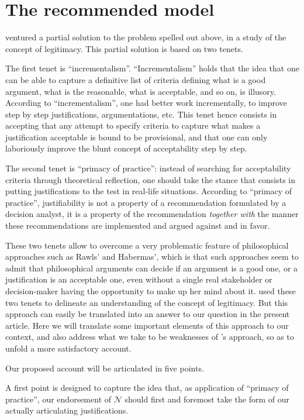 \documentclass[preprint, french, english, 11pt, authoryear]{elsarticle}%
\newcommand{\adv}{\mathscr{N}}
\begin{document}
\section{The recommended model}
\cite{meinard_what_2017} ventured a partial solution to the problem spelled out above, in a study of the concept of legitimacy. This partial solution is based on two tenets.

The first tenet is ``incrementalism''. ``Incrementalism'' holds that the idea that one can be able to capture a definitive list of criteria defining what is a good argument, what is the reasonable, what is acceptable, and so on, is illusory. According to ``incrementalism'', one had better work incrementally, to improve step by step justifications, argumentations, etc. This tenet hence consists in accepting that any attempt to specify criteria to capture what makes a justification acceptable is bound to be provisional, and that one can only laboriously improve the blunt concept of acceptability step by step.

The second tenet is ``primacy of practice'': instead of searching for acceptability criteria through theoretical reflection, one should take the stance that consists in putting justifications to the test in real-life situations. According to ``primacy of practice'', justifiability is not a property of a recommendation formulated by a decision analyst, it is a property of the recommendation \emph{together with} the manner these recommendations are  implemented and argued against and in favor.

These two tenets allow to overcome a very problematic feature of philosophical approaches such as Rawls' and Habermas', which is that such approaches seem to admit that philosophical arguments can decide if an argument is a good one, or a justification is an acceptable one, even without a single real stakeholder or decision-maker having the opportunity to make up her mind about it.\cite{meinard_what_2017} used these two tenets to delineate an understanding of the concept of legitimacy. But this approach can easily be translated into an answer to our question in the present article. Here we will translate some important elements of this approach to our context, and also address what we take to be weaknesses of \cite{meinard_what_2017}'s approach, so as to unfold a more satisfactory account.

Our proposed account will be articulated in five points.

A first point is designed to capture the idea that, as application of ``primacy of practice'', our endorsement of $\adv$ should first and foremost take the form of our actually articulating justifications.
\end{document}
